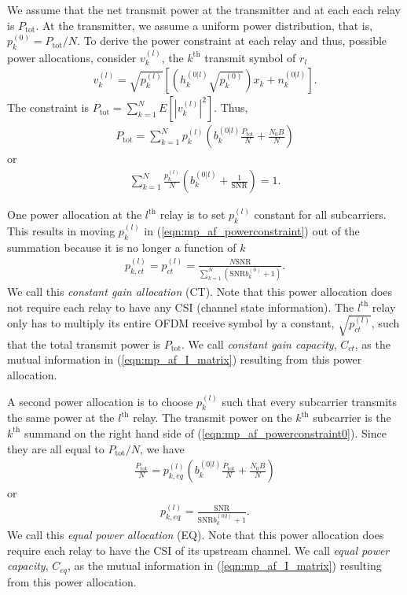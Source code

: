We assume that the net transmit power at the transmitter and at each each relay is $P_{\mbox{tot}}$.  At the transmitter, we assume a uniform power distribution, that is, $p_k^{(0)} = P_{\mbox{tot}}/N$.  To derive the power constraint at each relay and thus, possible power allocations, consider $v_k^{(l)}$, the $k^{\mbox{th}}$ transmit symbol of $r_l$
\begin{eqnarray}
v_k^{(l)} = \sqrt{p_k^{(l)}} \left[ \left(  h_k^{(0|l)}  \sqrt{p_k^{(0)}} \right)  x_k + n_k^{(0|l)} \right] \mbox{.}
\end{eqnarray}
The constraint is $P_{\mbox{tot}} = \displaystyle \sum_{k=1}^{N} E \left[ \left| v_k^{(l)} \right|^2 \right]$.  Thus,
\begin{eqnarray}
P_{\mbox{tot}} = \displaystyle \sum_{k=1}^{N} p_k^{(l)}
\left( b_k^{(0|l)} \frac{P_{\mbox{tot}}}{N}  + 
\frac{N_0 B}{N} \right)
\label{eqn:mp_af_powerconstraint0}
\end{eqnarray}
or
\begin{eqnarray}
\sum_{k=1}^N \frac{ p_k^{(l)}}{N} \left(
b_k^{(0|l)} + 
\frac{1}{\mbox{SNR}} \right) =1.
\label{eqn:mp_af_powerconstraint}
\end{eqnarray}

One power allocation at the $l^{\mbox{th}}$ relay is to set $p_k^{(l)}$ constant for all subcarriers.  This results in moving $p_k^{(l)}$ in (\ref{eqn:mp_af_powerconstraint}) out of the summation because it is no longer a function of $k$
\begin{eqnarray}
p_{k,ct}^{(l)} = p_{ct}^{(l)} = 
 \frac{N \mbox{SNR}}
{\displaystyle \sum_{k=1}^N \left( \mbox{SNR} b_k^{(0)} + 1 \right)
} \mbox{.}
\end{eqnarray}
We call this \emph{constant gain allocation} (CT).  Note that this power allocation does not require each relay to have any CSI (channel state information).  The $l^{\mbox{th}}$ relay only has to multiply its entire OFDM receive symbol by a constant, $\sqrt{p_{ct}^{(l)}}$, such that the total transmit power is $P_{\mbox{tot}}$.  We call \emph{constant 
gain capacity}, $C_{ct}$, as the mutual information in (\ref{eqn:mp_af_I_matrix}) resulting from this power allocation.

A second power allocation is to choose $p_k^{(l)}$ such that every subcarrier transmits the same power at the $l^{\mbox{th}}$ relay.  The transmit power on the $k^{\mbox{th}}$ subcarrier is the $k^{\mbox{th}}$ summand on the right hand side of (\ref{eqn:mp_af_powerconstraint0}).  Since they are all equal to $P_{\mbox{tot}}/N$, we have
\begin{eqnarray}
\frac{P_{\mbox{tot}}}{N} = 
 p_{k,eq}^{(l)}
\left( b_k^{(0|l)} \frac{P_{\mbox{tot}}}{N}   + 
\frac{N_0 B}{N}
\right) \end{eqnarray}
or
\begin{eqnarray}
p_{k,eq}^{(l)} =  \frac{ \mbox{SNR}}
{\displaystyle  \mbox{SNR} b_k^{(0|l)} + 1} \mbox{.}
\end{eqnarray}
We call this \emph{equal power allocation} (EQ).  Note that this power allocation does require each relay to have the CSI of its upstream channel.  We call \emph{equal power capacity}, $C_{eq}$, as the mutual information in (\ref{eqn:mp_af_I_matrix}) resulting from this power allocation.

